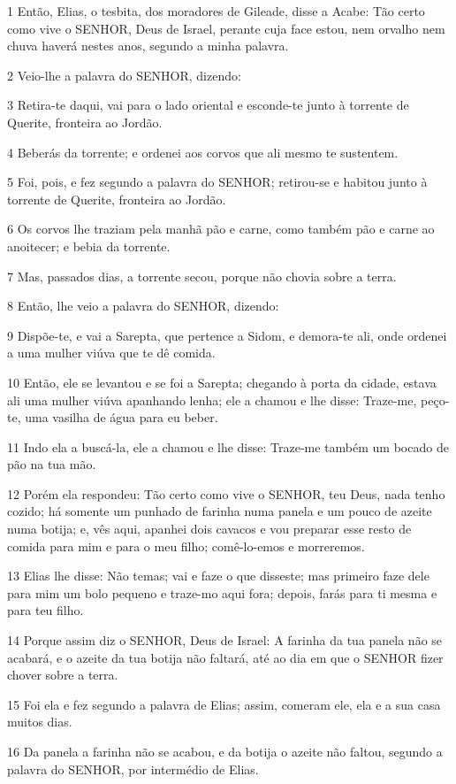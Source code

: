 \par 1 Então, Elias, o tesbita, dos moradores de Gileade, disse a Acabe: Tão certo como vive o SENHOR, Deus de Israel, perante cuja face estou, nem orvalho nem chuva haverá nestes anos, segundo a minha palavra.
\par 2 Veio-lhe a palavra do SENHOR, dizendo:
\par 3 Retira-te daqui, vai para o lado oriental e esconde-te junto à torrente de Querite, fronteira ao Jordão.
\par 4 Beberás da torrente; e ordenei aos corvos que ali mesmo te sustentem.
\par 5 Foi, pois, e fez segundo a palavra do SENHOR; retirou-se e habitou junto à torrente de Querite, fronteira ao Jordão.
\par 6 Os corvos lhe traziam pela manhã pão e carne, como também pão e carne ao anoitecer; e bebia da torrente.
\par 7 Mas, passados dias, a torrente secou, porque não chovia sobre a terra.
\par 8 Então, lhe veio a palavra do SENHOR, dizendo:
\par 9 Dispõe-te, e vai a Sarepta, que pertence a Sidom, e demora-te ali, onde ordenei a uma mulher viúva que te dê comida.
\par 10 Então, ele se levantou e se foi a Sarepta; chegando à porta da cidade, estava ali uma mulher viúva apanhando lenha; ele a chamou e lhe disse: Traze-me, peço-te, uma vasilha de água para eu beber.
\par 11 Indo ela a buscá-la, ele a chamou e lhe disse: Traze-me também um bocado de pão na tua mão.
\par 12 Porém ela respondeu: Tão certo como vive o SENHOR, teu Deus, nada tenho cozido; há somente um punhado de farinha numa panela e um pouco de azeite numa botija; e, vês aqui, apanhei dois cavacos e vou preparar esse resto de comida para mim e para o meu filho; comê-lo-emos e morreremos.
\par 13 Elias lhe disse: Não temas; vai e faze o que disseste; mas primeiro faze dele para mim um bolo pequeno e traze-mo aqui fora; depois, farás para ti mesma e para teu filho.
\par 14 Porque assim diz o SENHOR, Deus de Israel: A farinha da tua panela não se acabará, e o azeite da tua botija não faltará, até ao dia em que o SENHOR fizer chover sobre a terra.
\par 15 Foi ela e fez segundo a palavra de Elias; assim, comeram ele, ela e a sua casa muitos dias.
\par 16 Da panela a farinha não se acabou, e da botija o azeite não faltou, segundo a palavra do SENHOR, por intermédio de Elias.
